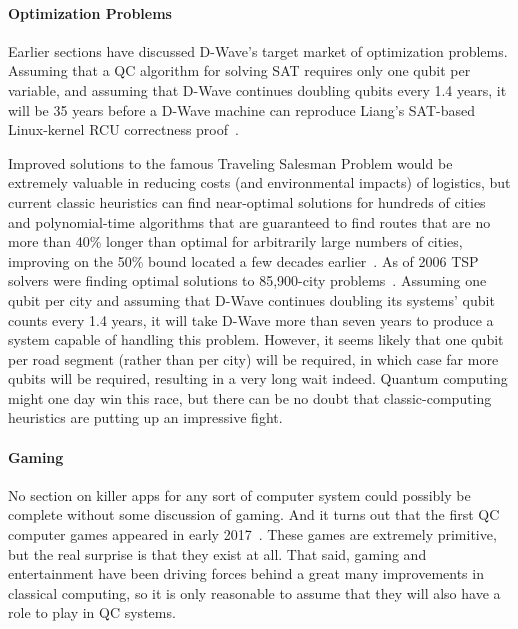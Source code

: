 \paragraph{Optimization Problems}
\label{sec:future:Optimization Problems}

Earlier sections have discussed D-Wave's target market of optimization
problems.
Assuming that a QC algorithm for solving SAT requires only one qubit
per variable, and assuming that D-Wave continues doubling qubits every
1.4 years, it will be 35 years before a D-Wave machine can reproduce
Liang's SAT-based Linux-kernel RCU correctness
proof~\cite{LihaoLiang2016VerifyTreeRCU}.

Improved solutions to the famous Traveling Salesman Problem would
be extremely valuable in reducing costs (and environmental impacts)
of logistics, but current classic heuristics can find near-optimal
solutions for hundreds of cities~\cite{Martin:1992:LMC:2307953.2308141}
and polynomial-time algorithms that are guaranteed to find routes
that are no more than 40\% longer than optimal for arbitrarily
large numbers of cities\cite{Sebo:2014:STN:2688265.2688281},
improving on the 50\% bound located a few decades
earlier~\cite{NicosChristofides1976TSP-FiftyPercent}.
As of 2006 TSP solvers were finding optimal solutions to
85,900-city problems~\cite{DLApplegate2007TSPtextbook}.
Assuming one qubit per city and assuming that D-Wave continues doubling
its systems' qubit counts every 1.4 years, it will take D-Wave more than seven
years to produce a system capable of handling this problem.
However, it seems likely that one qubit per road segment (rather than per city)
will be required, in which case far more qubits will be required,
resulting in a very long wait indeed.
Quantum computing might one day win this race, but there can be no doubt that
classic-computing heuristics are putting up an impressive fight.

\paragraph{Gaming}
\label{sec:future:Gaming}

No section on killer apps for any sort of computer system could possibly
be complete without some discussion of gaming.
And it turns out that the first QC computer games appeared in early
2017~\cite{JamesWootton2017IBMQEgame,JamesWootton2017IBMQEbattleship}.
These games are extremely primitive, but the real surprise is that
they exist at all.
That said, gaming and entertainment have been driving forces
behind a great many improvements in classical computing, so it is
only reasonable to assume that they will also have a role to play
in QC systems.

